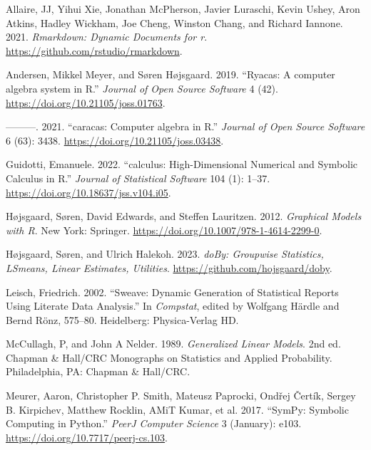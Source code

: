 \hypertarget{refs}{}
\begin{CSLReferences}{1}{0}
\leavevmode{}%
Allaire, JJ, Yihui Xie, Jonathan McPherson, Javier Luraschi, Kevin Ushey, Aron Atkins, Hadley Wickham, Joe Cheng, Winston Chang, and Richard Iannone. 2021. \emph{Rmarkdown: Dynamic Documents for r}. \url{https://github.com/rstudio/rmarkdown}.

\leavevmode{}%
Andersen, Mikkel Meyer, and Søren Højsgaard. 2019. {``{Ryacas: A computer algebra system in R}.''} \emph{Journal of Open Source Software} 4 (42). \url{https://doi.org/10.21105/joss.01763}.

\leavevmode{}%
---------. 2021. {``{caracas: Computer algebra in R}.''} \emph{Journal of Open Source Software} 6 (63): 3438. \url{https://doi.org/10.21105/joss.03438}.

\leavevmode{}%
Guidotti, Emanuele. 2022. {``{calculus: High-Dimensional Numerical and Symbolic Calculus in R}.''} \emph{Journal of Statistical Software} 104 (1): 1--37. \url{https://doi.org/10.18637/jss.v104.i05}.

\leavevmode{}%
Højsgaard, Søren, David Edwards, and Steffen Lauritzen. 2012. \emph{Graphical Models with {R}}. New York: Springer. \url{https://doi.org/10.1007/978-1-4614-2299-0}.

\leavevmode{}%
Højsgaard, Søren, and Ulrich Halekoh. 2023. \emph{{doBy: Groupwise Statistics, LSmeans, Linear Estimates, Utilities}}. \url{https://github.com/hojsgaard/doby}.

\leavevmode{}%
Leisch, Friedrich. 2002. {``Sweave: Dynamic Generation of Statistical Reports Using Literate Data Analysis.''} In \emph{Compstat}, edited by Wolfgang Härdle and Bernd Rönz, 575--80. Heidelberg: Physica-Verlag HD.

\leavevmode{}%
McCullagh, P, and John A Nelder. 1989. \emph{{Generalized Linear Models}}. 2nd ed. Chapman \& Hall/CRC Monographs on Statistics and Applied Probability. Philadelphia, PA: Chapman \& Hall/CRC.

\leavevmode{}%
Meurer, Aaron, Christopher P. Smith, Mateusz Paprocki, Ondřej Čertík, Sergey B. Kirpichev, Matthew Rocklin, AMiT Kumar, et al. 2017. {``SymPy: Symbolic Computing in Python.''} \emph{PeerJ Computer Science} 3 (January): e103. \url{https://doi.org/10.7717/peerj-cs.103}.


\end{CSLReferences}
